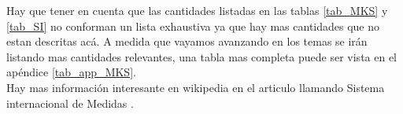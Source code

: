 Hay que tener en cuenta que las cantidades listadas en las tablas \ref{tab_MKS} y \ref{tab_SI} no conforman un lista exhaustiva ya que hay mas cantidades que no estan descritas ac\'a. A medida que vayamos avanzando en los temas se ir\'an listando mas cantidades relevantes, una tabla mas completa puede ser vista en el ap\'endice \ref{tab_app_MKS}.\\
Hay mas informaci\'on interesante en wikipedia en el articulo llamando Sistema internacional de Medidas \cite{Sis_Int_Med}. 
